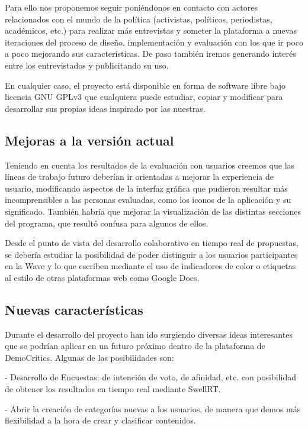 Para ello nos proponemos seguir poniéndonos en contacto con actores relacionados con el mundo de la política (activistas, políticos, periodistas, académicos, etc.) para realizar más entrevistas y someter la plataforma a nuevas iteraciones del proceso de diseño, implementación y evaluación con los que ir poco a poco mejorando sus características. De paso también iremos generando interés entre los entrevistados y publicitando su uso.

En cualquier caso, el proyecto está disponible en forma de software libre bajo licencia GNU GPLv3 que cualquiera puede estudiar, copiar y modificar para desarrollar sus propias ideas inspirado por las nuestras. 

\subsection{Mejoras a la versión actual}

Teniendo en cuenta los resultados de la evaluación con usuarios creemos que las líneas de trabajo futuro deberían ir orientadas a mejorar la experiencia de usuario, modificando aspectos de la interfaz gráfica que pudieron resultar más incomprensibles a las personas evaluadas, como los iconos de la aplicación y su significado. También habría que mejorar la visualización de las distintas secciones del programa, que resultó confusa para algunos de ellos. 

Desde el punto de vista del desarrollo colaborativo en tiempo real de propuestas, se debería estudiar la posibilidad de poder distinguir a los usuarios participantes en la Wave y lo que escriben mediante el uso de indicadores de color o etiquetas al estilo de otras plataformas web como Google Docs. 

\subsection{Nuevas características}

Durante el desarrollo del proyecto han ido surgiendo diversas ideas interesantes que se podrían aplicar en un futuro próximo dentro de la plataforma de DemoCritics. Algunas de las posibilidades son:

- Desarrollo de Encuestas: de intención de voto, de afinidad, etc. con posibilidad de obtener los resultados en tiempo real mediante SwellRT.

- Abrir la creación de categorías nuevas a los usuarios, de manera que demos más flexibilidad a la hora de crear y clasificar contenidos.

